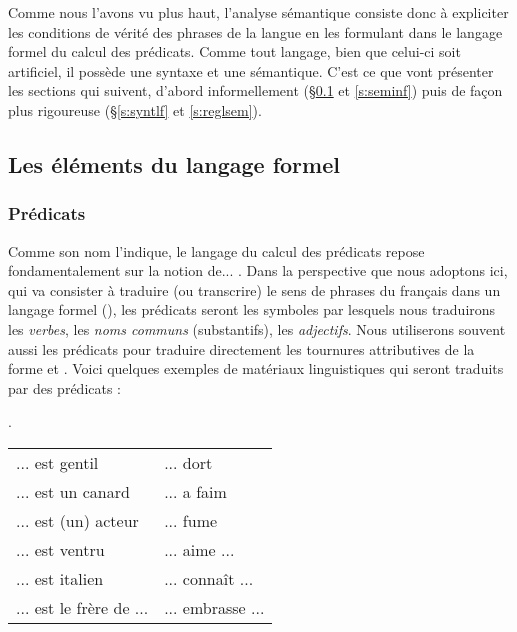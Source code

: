 Comme nous l'avons vu plus haut, l'analyse sémantique consiste donc à
expliciter les conditions de vérité des phrases de la langue en les
formulant dans le langage formel du calcul des prédicats.  Comme tout
langage, bien que celui-ci soit artificiel, il possède une syntaxe et
une sémantique.  C'est ce que vont présenter les sections qui suivent,
d'abord informellement (\S\ref{s:elf} et \ref{s:seminf}) puis de
façon plus rigoureuse (\S\ref{s:syntlf} et \ref{s:reglsem}).


\subsection{Les éléments du langage formel}
\label{s:elf}

\subsubsection{Prédicats}
\label{sss:pred}

Comme son nom l'indique, le langage du calcul des prédicats repose
fondamentalement sur la notion de... .  Dans la
perspective que nous adoptons ici, qui va consister à traduire (ou
transcrire) le sens de phrases du français dans un langage formel (\LO), les
prédicats seront les symboles par lesquels nous traduirons les
\emph{verbes},
les \emph{noms communs} (substantifs), les \emph{adjectifs}.
Nous utiliserons souvent aussi les prédicats pour traduire directement les
tournures attributives de la forme  et
.
Voici quelques exemples de matériaux linguistiques qui seront traduits
par des prédicats :


\ex.  \label{xpredicats}
\begin{tabular}[t]{l@{\qquad}l}
... est gentil & ... dort\\
... est un canard & ... a faim\\
... est (un) acteur & ... fume\\
... est ventru & ... aime ...\\
... est italien & ... connaît ...\\
... est le frère de ... & ... embrasse ...\\
\end{tabular}


